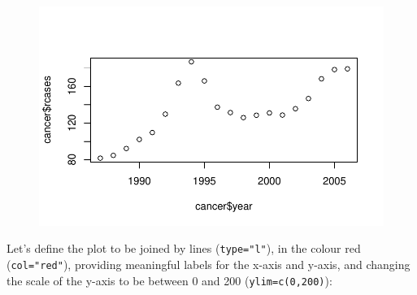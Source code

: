 \documentclass[
  a4paper,
]{memoir}
\newenvironment{Shaded}{\begin{snugshade}}{\end{snugshade}}
\newcommand{\AttributeTok}[1]{\textcolor[rgb]{0.00,0.00,0.00}{#1}}
\newcommand{\DecValTok}[1]{\textcolor[rgb]{0.00,0.00,0.00}{#1}}
\newcommand{\FunctionTok}[1]{\textcolor[rgb]{0.00,0.00,0.00}{#1}}
\newcommand{\NormalTok}[1]{\textcolor[rgb]{0.00,0.00,0.00}{#1}}
\newcommand{\SpecialCharTok}[1]{\textcolor[rgb]{0.00,0.00,0.00}{#1}}
\newcommand{\StringTok}[1]{\textcolor[rgb]{0.00,0.00,0.00}{#1}}
\begin{document}
\begin{figure}[H]

{\centering \includegraphics{01-intro_files/figure-pdf/unnamed-chunk-108-1.pdf}

}

\end{figure}

Let's define the plot to be joined by lines (\texttt{type="l"}), in the
colour red (\texttt{col="red"}), providing meaningful labels for the
x-axis and y-axis, and changing the scale of the y-axis to be between 0
and 200 (\texttt{ylim=c(0,200)}):

\begin{Shaded}
\end{Shaded}
\end{document}
